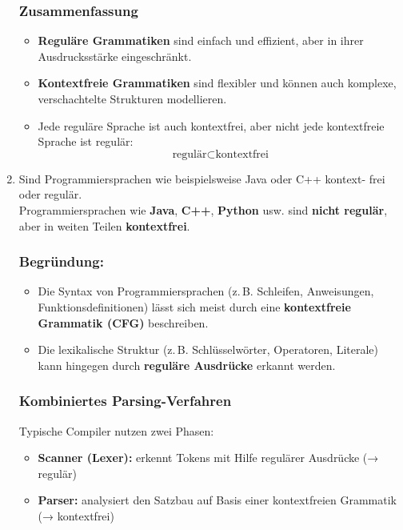 \documentclass[a4paper,12pt]{article}
\begin{document}
\begin{enumerate}
			\vspace{1em}
			
			\subsubsection*{Zusammenfassung}
			
			\begin{itemize}
				\item \textbf{Reguläre Grammatiken} sind einfach und effizient, aber in ihrer Ausdrucksstärke eingeschränkt.
				\item \textbf{Kontextfreie Grammatiken} sind flexibler und können auch komplexe, verschachtelte Strukturen modellieren.
				\item Jede reguläre Sprache ist auch kontextfrei, aber nicht jede kontextfreie Sprache ist regulär:
				\[
				\text{regulär} \subset \text{kontextfrei}
				\]
			\end{itemize}
			
			
			\item Sind Programmiersprachen wie beispielsweise Java oder C++ kontext-
			frei oder regulär.\\

			Programmiersprachen wie \textbf{Java}, \textbf{C++}, \textbf{Python} usw. sind \textbf{nicht regulär}, aber in weiten Teilen \textbf{kontextfrei}.
			
			\subsubsection*{Begründung:}
			
			\begin{itemize}
				\item Die Syntax von Programmiersprachen (z.\,B. Schleifen, Anweisungen, Funktionsdefinitionen) lässt sich meist durch eine \textbf{kontextfreie Grammatik (CFG)} beschreiben.
				\item Die lexikalische Struktur (z.\,B. Schlüsselwörter, Operatoren, Literale) kann hingegen durch \textbf{reguläre Ausdrücke} erkannt werden.
			\end{itemize}
			
			\subsubsection*{Kombiniertes Parsing-Verfahren}
			
			Typische Compiler nutzen zwei Phasen:
			
			\begin{itemize}
				\item \textbf{Scanner (Lexer):} erkennt Tokens mit Hilfe regulärer Ausdrücke (→ regulär)
				\item \textbf{Parser:} analysiert den Satzbau auf Basis einer kontextfreien Grammatik (→ kontextfrei)
			\end{itemize}
			

\end{enumerate}
\end{document}
